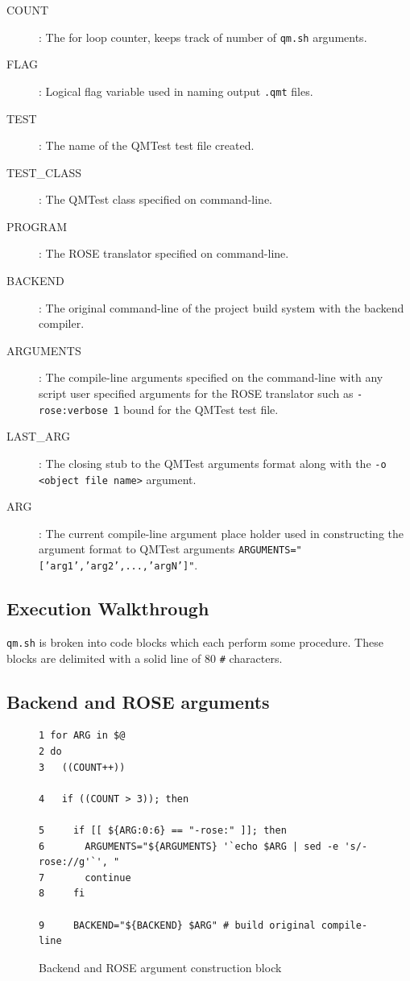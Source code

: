\begin{description}
  \item[COUNT] : The for loop counter, keeps track of number of {\tt qm.sh}
	arguments.
  \item[FLAG] : Logical flag variable used in naming output {\tt .qmt} files.
  \item[TEST] : The name of the QMTest test file created.
  \item[TEST\_CLASS] : The QMTest class specified on command-line.
  \item[PROGRAM] : The ROSE translator specified on command-line.
  \item[BACKEND] : The original command-line of the project build system with
	the backend compiler.
  \item[ARGUMENTS] : The compile-line arguments specified on the command-line
	with any script user specified arguments for the ROSE translator such
	as {\tt -rose:verbose 1} bound for the QMTest test file.
  \item[LAST\_ARG] : The closing stub to the QMTest arguments format along with
	the {\tt -o <object file name>} argument.
  \item[ARG] : The current compile-line argument place holder used in
	constructing the argument format to QMTest arguments
	{\tt ARGUMENTS="['arg1','arg2',...,'argN']"}. 

\end{description}

\subsection{Execution Walkthrough}
{\tt qm.sh} is broken into code blocks which each perform some procedure. These
blocks are delimited with a solid line of 80 {\tt \#} characters.

\subsection{Backend and ROSE arguments}

\begin{figure}[!ht]
{\scriptsize
\begin{verbatim}
1 for ARG in $@
2 do
3   ((COUNT++))
                                                                                
4   if ((COUNT > 3)); then
                                                                                
5     if [[ ${ARG:0:6} == "-rose:" ]]; then
6       ARGUMENTS="${ARGUMENTS} '`echo $ARG | sed -e 's/-rose://g'`', "
7       continue
8     fi
                                                                                
9     BACKEND="${BACKEND} $ARG" # build original compile-line
\end{verbatim}
}
\caption{Backend and ROSE argument construction block}
\end{figure}

